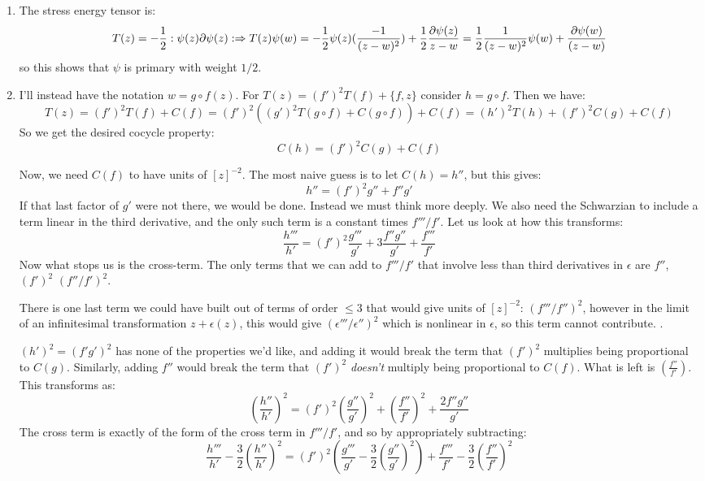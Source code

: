 \documentclass[11pt]{article}
\begin{document}
\begin{enumerate}
	\item The stress energy tensor is:
	\[
		T(z) = - \frac12 :\psi(z) \partial \psi(z): \Rightarrow T(z) \psi(w) = -\frac12 \psi(z) (\frac{-1}{(z-w)^2}) + \frac12 \frac{\partial \psi(z)}{z-w} = \frac12 \frac{1}{(z-w)^2} \psi(w) + \frac{\partial \psi(w)}{(z-w)}
	\]
	so this shows that $\psi$ is primary with weight $1/2$.
	
	\item I'll instead have the notation $w = g \circ f(z)$. For $T(z) = (f')^2 T(f) + \{f, z\}$ consider $h = g \circ f$. Then we have:
	\[
		T(z) = (f')^2 T(f) + C(f) = (f')^2 ((g')^2 T(g \circ f) + C(g \circ f)) + C(f) = (h')^2 T(h) + (f')^2 C(g) + C(f)
	\]
	So we get the desired cocycle property: 
	\[
		C(h) = (f')^2 C(g) + C(f)
	\]
	
	Now, we need $C(f)$ to have units of $[z]^{-2}$. The most naive guess is to let $C(h) = h''$, but this gives:
	\[
		h'' = (f')^2 g'' + f'' g'
	\]
	If that last factor of $g'$ were not there, we would be done. Instead we must think more deeply. 
	We also need the Schwarzian to include a term linear in the third derivative, and the only such term is a constant times $f'''/f'$. Let us look at how this transforms:
	\[
		\frac{h'''}{h'} = (f')^2 \frac{g'''}{g'} + 3 \frac{f'' g''}{g'} + \frac{f'''}{f'}
	\]
	Now what stops us is the cross-term. The only terms that we can add to $f'''/f'$ that involve less than third derivatives in $\epsilon$ are $f''$, $(f')^2$ $(f''/f')^2$.
	
	There is one last term we could have built out of terms of order $\leq 3$ that would give units of $[z]^{-2}$: $(f'''/f'')^2$, however in the limit of an infinitesimal transformation $z + \epsilon(z)$, this would give $(\epsilon'''/\epsilon'')^2$ which is nonlinear in $\epsilon$, so this term cannot contribute. . 
	
	$(h')^2 = (f' g')^2$ has none of the properties we'd like, and adding it would break the term that $(f')^2$ multiplies being proportional to $C(g)$. Similarly, adding $f''$ would break the term that $(f')^2$ \emph{doesn't} multiply being proportional to $C(f)$. What is left is  $\left(\frac{f''}{f'}\right)$. This transforms as:
	\[
		\left(\frac{h''}{h'}\right)^2 = (f')^2 \left(\frac{g''}{g'}\right)^2 +  \left(\frac{f''}{f'}\right)^2 + \frac{2 f'' g''}{g'} 
	\]
	The cross term is exactly of the form of the cross term in $f'''/f'$, and so by appropriately subtracting:
	\[
		\frac{h'''}{h'} - \frac32 \left(\frac{h''}{h'}\right)^2 = (f')^2 \left( \frac{g'''}{g'} - \frac32 \left(\frac{g''}{g'}\right)^2 \right) + \frac{f'''}{f'} - \frac32 \left(\frac{f''}{f'}\right)^2
	\]
	

\end{enumerate}
\end{document}
